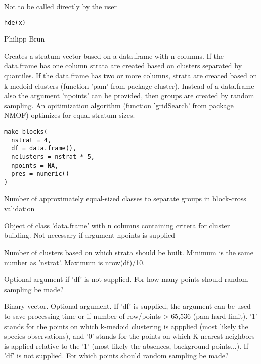 \documentclass[a4paper]{book}
\begin{document}
%
\begin{Description}\relax
Not to be called directly by the user
\end{Description}
%
\begin{Usage}
\begin{verbatim}
hde(x)
\end{verbatim}
\end{Usage}
%
\begin{Author}\relax
Philipp Brun
\end{Author}
%
\begin{Description}\relax
Creates a stratum vector based on a data.frame with n columns. If the data.frame
has one column strata are created based on clusters separated by quantiles. If
the data.frame has two or more columns, strata are created based on k-medoid
clusters (function 'pam' from package cluster). Instead of a data.frame also the
argument 'npoints' can be provided, then groups are created by random sampling.
An opitimization algorithm (function 'gridSearch' from package NMOF) optimizes
for equal stratum sizes.
\end{Description}
%
\begin{Usage}
\begin{verbatim}
make_blocks(
  nstrat = 4,
  df = data.frame(),
  nclusters = nstrat * 5,
  npoints = NA,
  pres = numeric()
)
\end{verbatim}
\end{Usage}
%
\begin{Arguments}
\begin{ldescription}
\item[\code{nstrat}] Number of approximately equal-sized classes to separate groups in block-cross validation

\item[\code{df}] Object of class 'data.frame' with n columns containing critera for cluster building.
Not necessary if argument npoints is supplied

\item[\code{nclusters}] Number of clusters based on which strata should be built.
Minimum is the same number as 'nstrat'. Maximum is nrow(df)/10.

\item[\code{npoints}] Optional argument if 'df' is not supplied. For how many points
should random sampling be made?

\item[\code{pres}] Binary vector. Optional argument. If 'df' is supplied, the argument can be used to
save processing time or if number of row/points > 65,536 (pam hard-limit). '1' stands for the points
on which k-medoid clustering is appplied (most likely the species observations), and '0' stands
for the points on which K-nearest neighbors is applied relative to the '1' (most likely the absences,
background points...). If 'df' is not supplied. For which points should random sampling be made?
\end{ldescription}
\end{Arguments}
\end{document}
